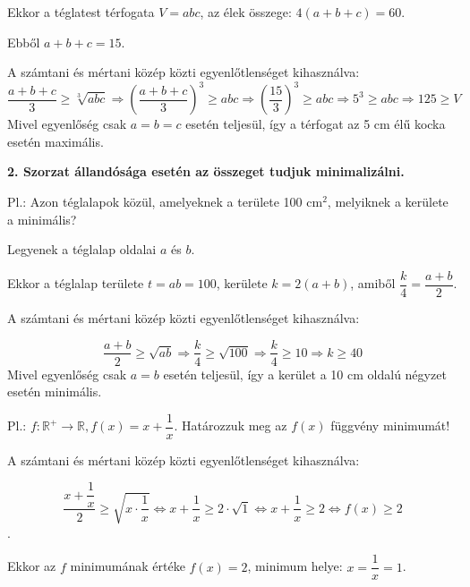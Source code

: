 \documentclass[12pt,a4paper]{article}
\begin{document}
Ekkor a téglatest térfogata $V = abc$, az élek összege: $4(a + b + c) = 60$.

Ebből $a + b + c = 15$.

A számtani és mértani közép közti egyenlőtlenséget kihasználva:
$$\dfrac{a+b+c}{3}\geq \sqrt[3]{abc}\Rightarrow \left(\dfrac{a+b+c}{3} \right)^3\geq abc\Rightarrow \left(\dfrac{15}{3} \right)^3\geq abc \Rightarrow 5^3\geq abc \Rightarrow 125\geq V$$
Mivel egyenlőség csak $a = b = c$ esetén teljesül, így a térfogat az 5 cm élű kocka esetén maximális.

\vspace{20px}
\textbf{2. Szorzat állandósága esetén az összeget tudjuk minimalizálni.}

Pl.: Azon téglalapok közül, amelyeknek a területe 100 cm$^2$, melyiknek a kerülete a minimális?

Legyenek a téglalap oldalai $a$ és $b$.

Ekkor a téglalap területe $t = ab = 100$, kerülete $k = 2(a + b)$, amiből $\dfrac{k}{4}=\dfrac{a+b}{2}$.

A számtani és mértani közép közti egyenlőtlenséget kihasználva:

$$\dfrac{a+b}{2}\geq \sqrt{ab}\Rightarrow \dfrac{k}{4}\geq \sqrt{100}\Rightarrow \dfrac{k}{4}\geq 10\Rightarrow k\geq 40$$
Mivel egyenlőség csak $a = b$ esetén teljesül, így a kerület a 10 cm oldalú négyzet esetén minimális.

\vspace{20px}
Pl.: $f: \mathbb{R^+}\rightarrow \mathbb{R}, f(x)=x+\dfrac{1}{x}$. Határozzuk meg az $f(x)$ függvény minimumát!

A számtani és mértani közép közti egyenlőtlenséget kihasználva:

$$\dfrac{x+\dfrac{1}{x}}{2}\geq \sqrt{x\cdot \dfrac{1}{x}}\Leftrightarrow x+\dfrac{1}{x}\geq 2\cdot \sqrt{1}\Leftrightarrow x+\dfrac{1}{x}\geq 2 \Leftrightarrow 	f(x)\geq 2$$.

Ekkor az $f$ minimumának értéke $f(x) = 2$, minimum helye: $x=\dfrac{1}{x}=1$.
\end{document}
